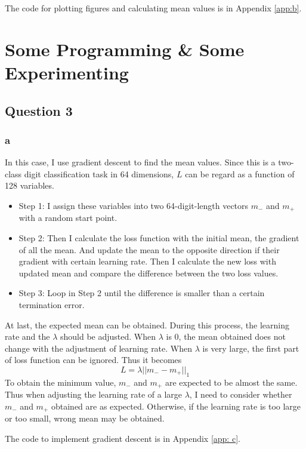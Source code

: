 \documentclass[a4paper]{scrartcl}
\begin{document}
The code for plotting figures and calculating mean values is in Appendix \ref{app:b}.

\section{Some Programming \& Some Experimenting}

\subsection{Question 3}
\subsubsection{a}
In this case, I use gradient descent to find the mean values.
Since this is a two-class digit classification task in 64 dimensions, $L$ can be regard as a function of 128 variables. 
\begin{itemize}
\item Step 1: I assign these variables into two 64-digit-length vectors $m_-$ and $m_+$ with a random start point. 
\item Step 2: Then I calculate the loss function with the initial mean, the gradient of all the mean. And update the mean to the opposite direction if their gradient with certain learning rate. 
Then I calculate the new loss with updated mean and compare the difference between the two loss values.
\item Step 3: Loop in Step 2 until the difference is smaller than a certain termination error.
\end{itemize}
At last, the expected mean can be obtained. During this process, the learning rate and the $\lambda$ should be adjusted. 
When $\lambda$ is 0, the mean obtained does not change with the adjustment of learning rate. 
When $\lambda$ is very large, the first part of loss function can be ignored. 
Thus it becomes $$L = \lambda||m_- - m_ +||_1$$ 
To obtain the minimum value, $m_-$ and $m_+$ are expected to be almost the same. 
Thus when adjusting the learning rate of a large $\lambda$, I need to consider whether $m_-$ and $m_+$ obtained are as expected. 
Otherwise, if the learning rate is too large or too small, wrong mean may be obtained.

The code to implement gradient descent is in Appendix \ref{app: c}.
\end{document}
